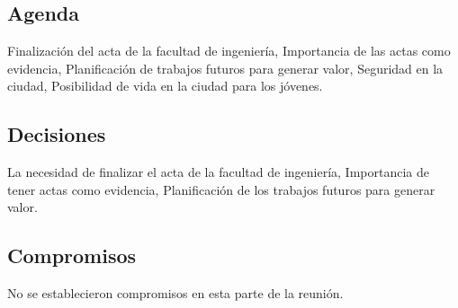 \documentclass{article}
\begin{document}
\subsection{Agenda}
Finalización del acta de la facultad de ingeniería, Importancia de las actas como evidencia, Planificación de trabajos futuros para generar valor, Seguridad en la ciudad, Posibilidad de vida en la ciudad para los jóvenes.

\subsection{Decisiones}
La necesidad de finalizar el acta de la facultad de ingeniería, Importancia de tener actas como evidencia, Planificación de los trabajos futuros para generar valor.

\subsection{Compromisos}
No se establecieron compromisos en esta parte de la reunión.
\end{document}
